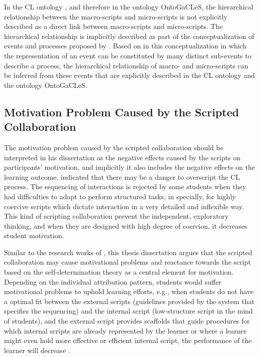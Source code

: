 In the CL ontology \cite{IsotaniInabaIkedaMizoguchi2009}, and therefore in the ontology OntoGaCLeS, the hierarchical relationship between the macro-scripts and micro-scripts is not explicitly described as a direct link between macro-scripts and micro-scripts. The hierarchical relationship is implicitly described as part of the conceptualization of events and processes proposed by . Based on in this conceptualization in which the representation of an event can be constituted by many distinct sub-events to describe a process, the hierarchical relationship of macro- and micro-scripts can be inferred from these events that are explicitly described in the CL ontology and the ontology OntoGaCLeS.

\subsection{Motivation Problem Caused by the Scripted Collaboration}
\label{subsec:motivation-problem}

The motivation problem caused by the scripted collaboration should be interpreted in his dissertation as the negative effects caused by the scripts on participants' motivation, and implicitly it also includes the negative effects on the learning outcome. 
 indicated that there may be a danger to overscript the CL process. The sequencing of interactions is rejected by some students when they had difficulties to adapt to perform structured tasks, in specially, for highly coercive scripts which dictate interaction in a very detailed and inflexible way. This kind of scripting collaboration prevent the independent, exploratory thinking, and when they are designed with high degree of coercion, it decreases student motivation. 

Similar to the research works of , this thesis dissertation argues that the scripted collaboration may cause motivational problems and reactance towards the script based on the self-determination theory \cite{DeciRyan2010} as a central element for motivation. Depending on the individual attribution pattern, students would suffer motivational problems to uphold learning efforts, e.g., when students do not have a optimal fit between the external scripts (guidelines provided by the system that specifies the sequencing) and the internal script (low-structure script in the mind of students), and the external script provides scaffolds that guide procedures for which internal scripts are already represented by the learner or where a learner might even hold more effective or efficient internal script, the performance of the learner will decrease \cite{StegmannMuGehlen-BaumFischer2011}.

